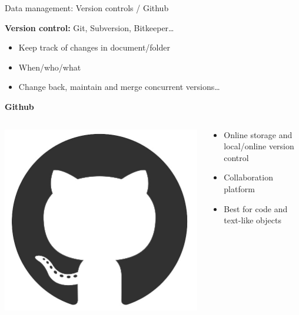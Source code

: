 \documentclass[10pt]{beamer}%
\begin{document}
\begin{frame}{Data management: Version controls / Github}
    \begin{block}{\textbf{Version control:} Git, Subversion, Bitkeeper\dots}
    \begin{itemize}
    \item Keep track of changes in document/folder
    \item When/who/what
    \item Change back, maintain and merge concurrent versions\dots
    \end{itemize}
    \end{block}
        \pause
    \begin{block}{\textbf{ Github} }
        \begin{columns}
            \begin{column}{0.2\textwidth}         
                \includegraphics[width=1\textwidth]{Figures/github}
            \end{column}
            \begin{column}{0.8\textwidth}
                \begin{itemize}
                    \item Online storage and local/online version control
                    \item Collaboration platform
                    \item Best for code and text-like objects
                \end{itemize}
            \end{column}
        \end{columns}
    \end{block}
\end{frame}
\end{document}
